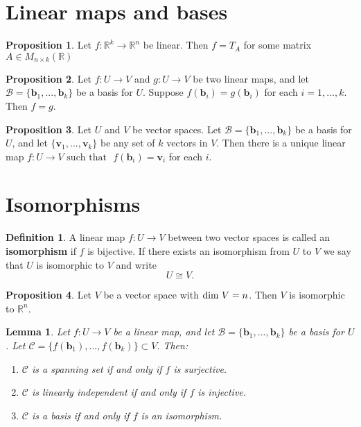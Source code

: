 \documentclass[11pt,a4paper]{article}
\newcommand\R{\mathbb{R}}
\newcommand\Bf{\mathcal{B}}
\newcommand\Cf{\mathcal{C}}
\newcommand\bb{\mathbf{b}}
\newcommand\vb{\mathbf{v}}
\newcommand\st{\text{ such that }}
\newtheorem{lemma}{Lemma}
\theoremstyle{definition}
\newtheorem{definition}{Definition}
\newtheorem{proposition}{Proposition}
\begin{document}
\section{Linear maps and bases}

\begin{proposition}
    Let $ f : \R^k \to \R^n $ be linear. Then $ f = T_A $ for some matrix $ A \in M_{n \times k} (\R) $
\end{proposition}

\begin{proposition}
    Let $ f : U \to V $ and $ g : U \to V $  be two linear maps, and let $ \Bf = \{ \bb_1, ..., \bb_k \} $ be a basis for $ U $. Suppose $ f(\bb_i) = g(\bb_i) $
    for each $ i = 1, ..., k. $ Then $ f = g $.
\end{proposition}

\begin{proposition}
    Let $ U $ and $ V $ be vector spaces. Let $ \Bf = \{ \bb_1, ..., \bb_k \} $ be a basis for $ U $, and let $ \{\vb_1, ..., \vb_k \} $ be any set of $ k $ vectors in $ V $.
    Then there is a unique linear map $ f : U \to V \st $ $ f (\bb_i) = \vb_i $ for each $ i $.
\end{proposition}

\section{Isomorphisms}

\begin{definition}
    A linear map $ f : U \to V $ between two vector spaces is called an \textbf{isomorphism} if $ f $ is bijective. If there exists an isomorphism from $ U $ to $ V $ 
    we say that $ U $ is isomorphic to $ V $ and write
    \[ U \cong V.\]
\end{definition}

\begin{proposition}
    Let $ V $ be a vector space with $ \textup{dim } V  = n$. Then $ V $ is isomorphic to $ \R^n $. 
\end{proposition}

\begin{lemma}
   Let $ f : U \to V $ be a linear map, and let $ \Bf = \{ \bb_1, ..., \bb_k \} $ be a basis for $ U $. Let $ \mathcal{C} = \{ f(\bb_1), ..., f(\bb_k) \} \subset V.$ 
   Then: 
   \begin{enumerate}
       \item $ \Cf $ is a spanning set if and only if $ f $ is surjective.
       \item $ \Cf $ is linearly independent if and only if $ f $ is injective.
       \item $ \Cf $ is a basis if and only if $ f $ is an isomorphism.
   \end{enumerate}
\end{lemma}
\end{document}
